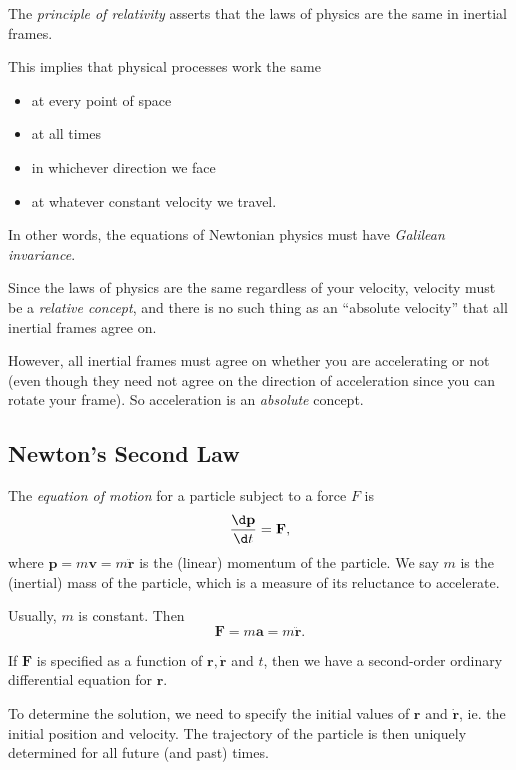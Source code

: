 \documentclass[a4paper]{article}
\begin{document}
\begin{law}
  The \emph{principle of relativity} asserts that the laws of physics are the same in inertial frames.
\end{law}

This implies that physical processes work the same
\begin{itemize}
  \item at every point of space
  \item at all times
  \item in whichever direction we face
  \item at whatever constant velocity we travel.
\end{itemize}

In other words, the equations of Newtonian physics must have \emph{Galilean invariance}.

Since the laws of physics are the same regardless of your velocity, velocity must be a \emph{relative concept}, and there is no such thing as an ``absolute velocity'' that all inertial frames agree on.

However, all inertial frames must agree on whether you are accelerating or not (even though they need not agree on the direction of acceleration since you can rotate your frame). So acceleration is an \emph{absolute} concept.

\subsection{Newton's Second Law}
\begin{law}
  The \emph{equation of motion} for a particle subject to a force $F$ is
  \[
    \frac{\d \mathbf{p}}{\d t} = \mathbf{F},
  \]
  where $\mathbf{p} = m\mathbf{v} = m\ddot{\mathbf{r}}$ is the (linear) momentum of the particle. We say $m$ is the (inertial) mass of the particle, which is a measure of its reluctance to accelerate.
\end{law}

Usually, $m$ is constant. Then
\[
  \mathbf{F} = m\mathbf{a} = m\ddot{\mathbf{r}}.
\]


If $\mathbf{F}$ is specified as a function of $\mathbf{r}, \dot{\mathbf{r}}$ and $t$, then we have a second-order ordinary differential equation for $\mathbf{r}$.

To determine the solution, we need to specify the initial values of $\mathbf{r}$ and $\dot{\mathbf{r}}$, ie. the initial position and velocity. The trajectory of the particle is then uniquely determined for all future (and past) times.
\end{document}
